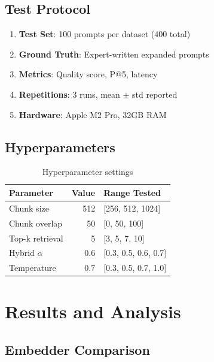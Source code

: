 \documentclass[11pt,a4paper]{article}
\begin{document}
\subsection{Test Protocol}

\begin{enumerate}
    \item \textbf{Test Set}: 100 prompts per dataset (400 total)
    \item \textbf{Ground Truth}: Expert-written expanded prompts
    \item \textbf{Metrics}: Quality score, P@5, latency
    \item \textbf{Repetitions}: 3 runs, mean $\pm$ std reported
    \item \textbf{Hardware}: Apple M2 Pro, 32GB RAM
\end{enumerate}

\subsection{Hyperparameters}

\begin{table}[h]
\centering
\small
\begin{tabular}{lrl}
\toprule
\textbf{Parameter} & \textbf{Value} & \textbf{Range Tested} \\
\midrule
Chunk size & 512 & [256, 512, 1024] \\
Chunk overlap & 50 & [0, 50, 100] \\
Top-k retrieval & 5 & [3, 5, 7, 10] \\
Hybrid $\alpha$ & 0.6 & [0.3, 0.5, 0.6, 0.7] \\
Temperature & 0.7 & [0.3, 0.5, 0.7, 1.0] \\
\bottomrule
\end{tabular}
\caption{Hyperparameter settings}
\label{tab:hyperparams}
\end{table}

\section{Results and Analysis}
\label{sec:results}

\subsection{Embedder Comparison}
\end{document}
